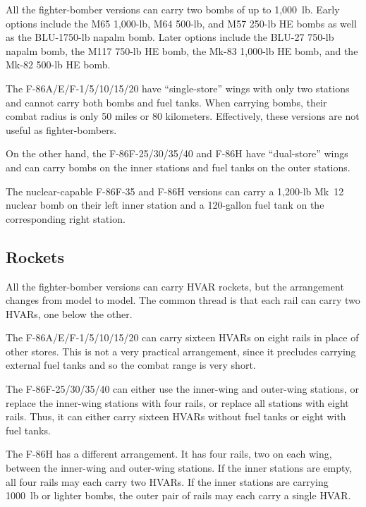 All the fighter-bomber versions can carry two bombs of up to 1,000~lb. Early options include the M65 1,000-lb, M64 500-lb, and M57 250-lb HE bombs as well as the BLU-1750-lb napalm bomb. Later options include the BLU-27 750-lb napalm bomb, the M117 750-lb HE bomb, the Mk-83 1,000-lb HE bomb, and the Mk-82 500-lb HE bomb.%

The F-86A/E/F-1/5/10/15/20 have “single-store” wings with only two stations and cannot carry both bombs and fuel tanks. When carrying bombs, their combat radius is only 50 miles or 80 kilometers. Effectively, these versions are not useful as fighter-bombers.

On the other hand, the F-86F-25/30/35/40 and F-86H have “dual-store” wings and can carry bombs on the inner stations and fuel tanks on the outer stations.

The nuclear-capable F-86F-35 and F-86H versions can carry a 1,200-lb Mk~12 nuclear bomb on their left inner station and a 120-gallon fuel tank on the corresponding right station.%

\subsection{Rockets}

All the fighter-bomber versions can carry HVAR rockets, but the arrangement changes from model to model. The common thread is that each rail can carry two HVARs, one below the other.

The F-86A/E/F-1/5/10/15/20 can carry sixteen HVARs on eight rails in place of other stores. This is not a very practical arrangement, since it precludes carrying external fuel tanks and so the combat range is very short.

The F-86F-25/30/35/40 can either use the inner-wing and outer-wing stations, or replace the inner-wing stations with four rails, or replace all stations with eight rails. Thus, it can either carry sixteen HVARs without fuel tanks or eight with fuel tanks.

The F-86H has a different arrangement. It has four rails, two on each wing, between the inner-wing and outer-wing stations. If the inner stations are empty, all four rails may each carry two HVARs. If the inner stations are carrying 1000~lb or lighter bombs, the outer pair of rails may each carry a single HVAR. %

